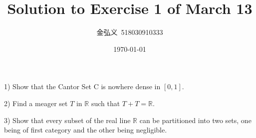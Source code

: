 \documentclass[a4paper, linespread=1.5]{article}
\begin{document}
    \title{Solution to Exercise 1 of March 13}
    \author{金弘义\ 518030910333}
    \date{\today}
    \maketitle
    
    \begin{customex}{1}
    	
        1) Show that the Cantor Set C is nowhere dense in $[0, 1]$.
        
        2) Find a meager set $T$ in $\mathbb{R}$ such that $T+T=\mathbb{R}$.
        
        3) Show that every subset of the real line $\mathbb{R}$ can be partitioned into two sets, one being of first category and the other being negligible. 
    \end{customex}
\end{document}
